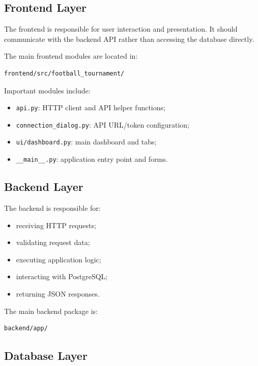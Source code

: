 \documentclass[12pt,a4paper]{article}
\begin{document}
\subsection{Frontend Layer}

The frontend is responsible for user interaction and presentation.
It should communicate with the backend API rather than accessing the
database directly.

The main frontend modules are located in:

\begin{lstlisting}
frontend/src/football_tournament/
\end{lstlisting}

Important modules include:

\begin{itemize}
    \item \texttt{api.py}: HTTP client and API helper functions;
    \item \texttt{connection\_dialog.py}: API URL/token configuration;
    \item \texttt{ui/dashboard.py}: main dashboard and tabs;
    \item \texttt{\_\_main\_\_.py}: application entry point and forms.
\end{itemize}

\subsection{Backend Layer}

The backend is responsible for:

\begin{itemize}
    \item receiving HTTP requests;
    \item validating request data;
    \item executing application logic;
    \item interacting with PostgreSQL;
    \item returning JSON responses.
\end{itemize}

The main backend package is:

\begin{lstlisting}
backend/app/
\end{lstlisting}

\subsection{Database Layer}
\end{document}
